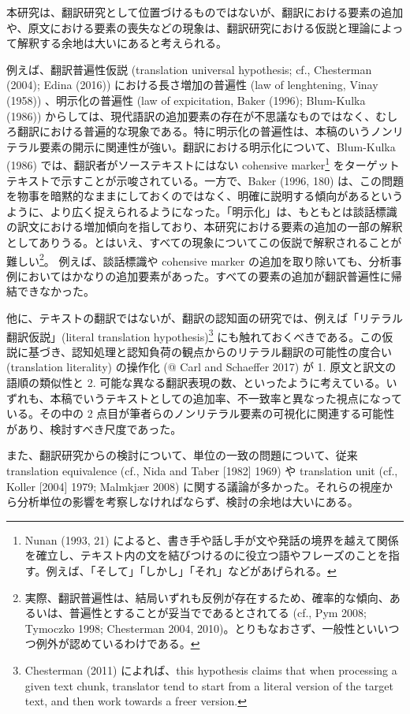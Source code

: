 \documentclass[
  letterpaper,
  DIV=11,
  numbers=noendperiod]{scrartcl}
\begin{document}
本研究は、翻訳研究として位置づけるものではないが、翻訳における要素の追加や、原文における要素の喪失などの現象は、翻訳研究における仮説と理論によって解釈する余地は大いにあると考えられる。

例えば、翻訳普遍性仮説 (translation universal hypothesis; cf.,
Chesterman (2004); Edina (2016)) における長さ増加の普遍性 (law of
lenghtening, Vinay (1958)) 、明示化の普遍性 (law of expicitation, Baker
(1996); Blum-Kulka (1986))
からしては、現代語訳の追加要素の存在が不思議なものではなく、むしろ翻訳における普遍的な現象である。特に明示化の普遍性は、本稿のいうノンリテラル要素の開示に関連性が強い。翻訳における明示化について、Blum-Kulka
(1986) では、翻訳者がソーステキストにはない cohensive marker\footnote{Nunan
  (1993, 21)
  によると、書き手や話し手が文や発話の境界を越えて関係を確立し、テキスト内の文を結びつけるのに役立つ語やフレーズのことを指す。例えば、「そして」「しかし」「それ」などがあげられる。}
をターゲットテキストで示すことが示唆されている。一方で、Baker (1996,
180)
は、この問題を物事を暗黙的なままにしておくのではなく、明確に説明する傾向があるというように、より広く捉えられるようになった。「明示化」は、もともとは談話標識の訳文における増加傾向を指しており、本研究における要素の追加の一部の解釈としてありうる。とはいえ、すべての現象についてこの仮説で解釈されることが難しい\footnote{実際、翻訳普遍性は、結局いずれも反例が存在するため、確率的な傾向、あるいは、普遍性とすることが妥当でであるとされてる
  (cf., Pym 2008; Tymoczko 1998; Chesterman 2004,
  2010)。とりもなおさず、一般性といいつつ例外が認めているわけである。}。
例えば、談話標識や cohensive marker
の追加を取り除いても、分析事例においてはかなりの追加要素があった。すべての要素の追加が翻訳普遍性に帰結できなかった。

他に、テキストの翻訳ではないが、翻訳の認知面の研究では、例えば「リテラル翻訳仮説」(literal
translation hypothesis)\footnote{Chesterman (2011) によれば、this
  hypothesis claims that when processing a given text chunk, translator
  tend to start from a literal version of the target text, and then work
  towards a freer version.}
にも触れておくべきである。この仮説に基づき、認知処理と認知負荷の観点からのリテラル翻訳の可能性の度合い
(translation literality) の操作化 (@ Carl and Schaeffer 2017) が 1.
原文と訳文の語順の類似性と 2.
可能な異なる翻訳表現の数、といったように考えている。いずれも、本稿でいうテキストとしての追加率、不一致率と異なった視点になっている。その中の
2
点目が筆者らのノンリテラル要素の可視化に関連する可能性があり、検討すべき尺度であった。

また、翻訳研究からの検討について、単位の一致の問題について、従来
translation equivalence (cf., Nida and Taber {[}1982{]} 1969) や
translation unit (cf., Koller {[}2004{]} 1979; Malmkjær 2008)
に関する議論が多かった。それらの視座から分析単位の影響を考察しなければならず、検討の余地は大いにある。
\end{document}
